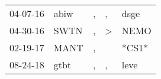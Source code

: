 \begin{supertabular}{p{0.07\textwidth}p{0.06\textwidth}p{0.02\textwidth}p{0.02\textwidth}p{0.06\textwidth}}
 04-07-16\textsuperscript{} &  abiw\textsuperscript{} &  , &             , &  dsge\textsuperscript{} \\
 04-30-16\textsuperscript{} &  SWTN\textsuperscript{} &  , &  \textgreater &  NEMO\textsuperscript{} \\
 02-19-17\textsuperscript{} &  MANT\textsuperscript{} &  , &               &                   *CS1* \\
 08-24-18\textsuperscript{} &  gtbt\textsuperscript{} &  , &             , &  leve\textsuperscript{} \\
\end{supertabular}
